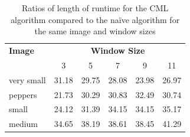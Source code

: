 \begin{table}
\centering
\caption{Ratios of length of runtime for the CML algorithm compared to the naïve algorithm for the same image and window sizes}
\label{tab:ratcml}
\begin{tabular}{@{}lccccc@{}}
\toprule
\textbf{Image} & \multicolumn{5}{c}{\textbf{Window Size}} \\
               & 3      & 5      & 7      & 9     & 11    \\ \midrule
very small     & 31.18  & 29.75  & 28.08  & 23.98 & 26.97 \\
peppers        & 21.73  & 30.29  & 30.83  & 32.49 & 30.74 \\
small          & 24.12  & 31.39  & 34.15  & 34.15 & 35.17 \\
medium         & 34.65  & 38.19  & 38.61  & 38.45 & 41.29 \\ \bottomrule
\end{tabular}
\end{table}


